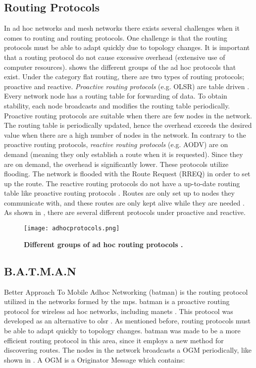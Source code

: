 \subsection{Routing Protocols}
In ad hoc networks and mesh networks there exists several challenges when it comes to routing and routing protocols. One challenge is that the routing protocols must be able to adapt quickly due to topology changes. It is important that a routing protocol do not cause excessive overhead (extensive use of computer resources).  shows the different groups of the ad hoc protocols that exist. Under the category flat routing, there are two types of routing protocols; proactive and reactive. \textit{Proactive routing protocols} (e.g. OLSR) are table driven \citep{proactivereactive}. Every network node has a routing table for forwarding of data. To obtain stability, each node broadcasts and modifies the routing table periodically. Proactive routing protocols are suitable when there are few nodes in the network. The routing table is periodically updated, hence the overhead exceeds the desired value when there are a high number of nodes in the network. In contrary to the proactive routing protocols, \textit{reactive routing protocols} (e.g. AODV) are on demand (meaning they only establish a route when it is requested). Since they are on demand, the overhead is significantly lower. These protocols utilize flooding. The network is flooded with the Route Request (RREQ) in order to set up the route. The reactive routing protocols do not have a up-to-date routing table like proactive routing protocols \cite{proactivereactive}. Routes are only set up to nodes they communicate with, and these routes are only kept alive while they are needed  \cite{adhoc2}. As shown in , there are several different protocols under proactive and reactive. 


\begin{figure}[t]
  \centering
    \texttt{[image: adhocprotocols.png]}
     \caption[Ad Hoc routing protocols]{\textbf{Different groups of ad hoc routing protocols \cite{adhoc}.}}
\label{fig:adhocprotocols}
\end{figure}


\subsection{B.A.T.M.A.N}
\label{subsec:batman}
Better Approach To Mobile Adhoc Networking (\gls{batman}) is the routing protocol utilized in the networks formed by the \glspl{mp}. \gls{batman} is a proactive routing protocol for wireless ad hoc networks, including \glspl{manet} \cite{batman}. This protocol was developed as an alternative to \gls{olsr} \cite{batman2}. As mentioned before, routing protocols must be able to adapt quickly to topology changes. \gls{batman} was made to be a more efficient routing protocol in this area, since it employs a new method for discovering routes. The nodes in the network broadcasts a OGM periodically, like shown in . A OGM is a Originator Message which contains: 

